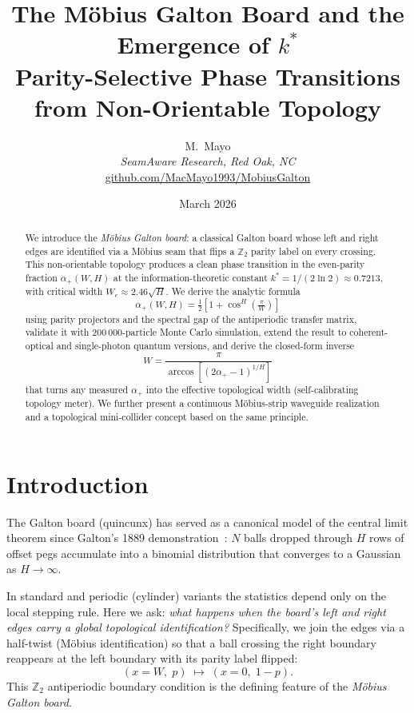 \documentclass[12pt,a4paper]{article}
\title{%
  \textbf{The Möbius Galton Board and the Emergence of $k^*$}\\
  \large Parity-Selective Phase Transitions from Non-Orientable Topology
}
\author{
  M.~Mayo\\
  \textit{SeamAware Research, Red Oak, NC}\\[4pt]
  \small\href{https://github.com/MacMayo1993/MobiusGalton}{github.com/MacMayo1993/MobiusGalton}
}
\date{March 2026}
\newcommand{\kstar}{k^*}
\newcommand{\We}{W_e}
\newcommand{\alphap}{\alpha_+}
\newcommand{\ZZ}{\mathbb{Z}}
\begin{document}
\maketitle

\begin{abstract}
We introduce the \emph{Möbius Galton board}: a classical Galton board whose
left and right edges are identified via a Möbius seam that flips a
$\mathbb{Z}_2$ parity label on every crossing. This non-orientable topology
produces a clean phase transition in the even-parity fraction
$\alpha_+(W,H)$ at the information-theoretic constant
$\kstar = 1/(2\ln 2) \approx 0.7213$, with critical width
$\We \approx 2.46\sqrt{H}$. We derive the analytic formula
\[
  \alphap(W,H) = \tfrac{1}{2}\!\left[1 + \cos^H\!\!\left(\tfrac{\pi}{W}\right)\right]
\]
using parity projectors and the spectral gap of the antiperiodic transfer
matrix, validate it with 200\,000-particle Monte Carlo simulation, extend
the result to coherent-optical and single-photon quantum versions, and
derive the closed-form inverse
\[
  W = \frac{\pi}{\arccos\!\left[(2\alphap-1)^{1/H}\right]}
\]
that turns any measured $\alphap$ into the effective topological width
(self-calibrating topology meter). We further present a continuous
Möbius-strip waveguide realization and a topological mini-collider
concept based on the same principle.
\end{abstract}

\tableofcontents
\newpage

\section{Introduction}
\label{sec:intro}

The Galton board (quincunx) has served as a canonical model of the
central limit theorem since Galton's 1889 demonstration~\cite{galton1889}:
$N$ balls dropped through $H$ rows of offset pegs accumulate into a
binomial distribution that converges to a Gaussian as $H\to\infty$.

In standard and periodic (cylinder) variants the statistics depend only
on the local stepping rule. Here we ask: \emph{what happens when the
board's left and right edges carry a global topological identification?}
Specifically, we join the edges via a half-twist (Möbius identification)
so that a ball crossing the right boundary reappears at the left boundary
with its parity label flipped:
\[
  (x = W,\; p) \;\mapsto\; (x = 0,\; 1-p).
\]
This $\ZZ_2$ antiperiodic boundary condition is the defining feature of the
\emph{Möbius Galton board}.
\end{document}
